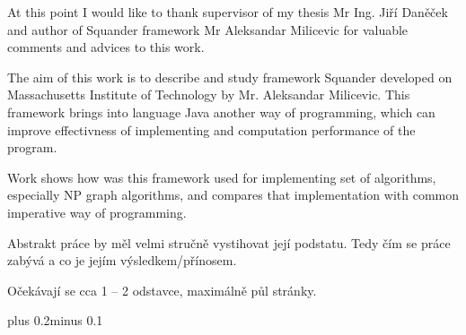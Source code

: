 \documentclass[11pt,twoside,a4paper]{book}
\begin{document}

\coverpagestarts


\acknowledgements
\noindent
At this point I would like to thank supervisor of my thesis Mr Ing. Jiří Daněček
and author of Squander framework Mr Aleksandar Milicevic for valuable comments
and advices to this work.





 
\abstractpage

The aim of this work is to describe and study framework Squander developed on
Massachusetts Institute of Technology by Mr. Aleksandar Milicevic. This
framework brings into language Java another way of programming, which can
improve effectivness of implementing and computation performance of the program.

Work shows how was this framework used for implementing set of algorithms,
especially NP graph algorithms, and compares that implementation with
common imperative way of programming.

\baselineskip

\noindent
Abstrakt práce by měl velmi stručně vystihovat její podstatu. Tedy čím se práce zabývá a co je jejím výsledkem/přínosem.

\noindent
Očekávají se cca 1 -- 2 odstavce, maximálně půl stránky.


\tableofcontents



\listoffigures



\listoftables



\mainbodystarts
\normalfont
{}\baselineskip plus 0.2\baselineskip minus 0.1\baselineskip
\end{document}
